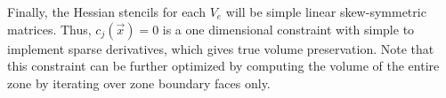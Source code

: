 Finally, the Hessian stencils for each $V_e$ will be simple linear skew-symmetric matrices.
Thus, $c_{j}(\vec{x}) = 0$ is a one dimensional constraint with simple to implement sparse
derivatives, which gives true volume preservation.
Note that this constraint can be further optimized by computing the volume of the entire zone by
iterating over zone boundary faces only.

